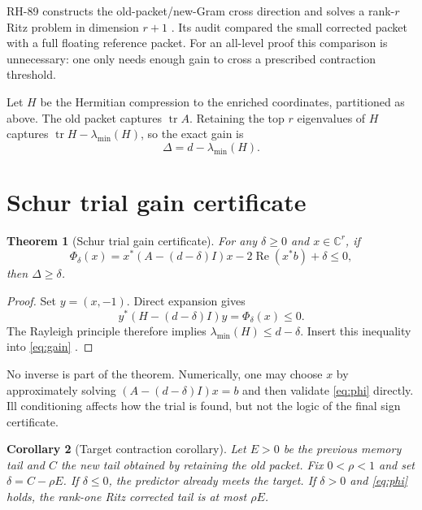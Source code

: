 \documentclass[11pt]{article}
\newtheorem{theorem}{Theorem}[section]
\newtheorem{corollary}[theorem]{Corollary}
\theoremstyle{remark}
\begin{document}
RH-89 constructs the old-packet/new-Gram cross direction and solves a rank-$r$
Ritz problem in dimension $r+1$ \citep{WangRitz2026}.  Its audit compared the
small corrected packet with a full floating reference packet.  For an
all-level proof this comparison is unnecessary: one only needs enough gain
to cross a prescribed contraction threshold.

Let $H$ be the Hermitian compression to the enriched coordinates, partitioned
as above.  The old packet captures $\operatorname{tr}A$.  Retaining the top
$r$ eigenvalues of $H$ captures
$\operatorname{tr}H-\lambda_{\min}(H)$, so the exact gain is
\begin{equation}
 \Delta=d-\lambda_{\min}(H).
 \label{eq:gain}
\end{equation}

\section{Schur trial gain certificate}

\begin{theorem}[Schur trial gain certificate]
\label{thm:schur}
For any $\delta\ge0$ and $x\in\mathbb C^r$, if
\begin{equation}
 \Phi_\delta(x)=
 x^*(A-(d-\delta)I)x-2\operatorname{Re}(x^*b)+\delta\le0,
 \label{eq:phi}
\end{equation}
then $\Delta\ge\delta$.
\end{theorem}

\begin{proof}
Set $y=(x,-1)$.  Direct expansion gives
\[
 y^*(H-(d-\delta)I)y=\Phi_\delta(x)\le0.
\]
The Rayleigh principle therefore implies
$\lambda_{\min}(H)\le d-\delta$.  Insert this inequality into
\eqref{eq:gain} \citep{Bhatia1997,HornJohnson2013}.
\end{proof}

No inverse is part of the theorem.  Numerically, one may choose $x$ by
approximately solving
$(A-(d-\delta)I)x=b$ and then validate \eqref{eq:phi} directly.  Ill
conditioning affects how the trial is found, but not the logic of the final
sign certificate.

\begin{corollary}[Target contraction corollary]
\label{cor:target}
Let $E>0$ be the previous memory tail and $C$ the new tail obtained by
retaining the old packet.  Fix $0<\rho<1$ and set
$\delta=C-\rho E$.  If $\delta\le0$, the predictor already meets the target.
If $\delta>0$ and \eqref{eq:phi} holds, the rank-one Ritz corrected tail is at
most $\rho E$.
\end{corollary}
\end{document}
